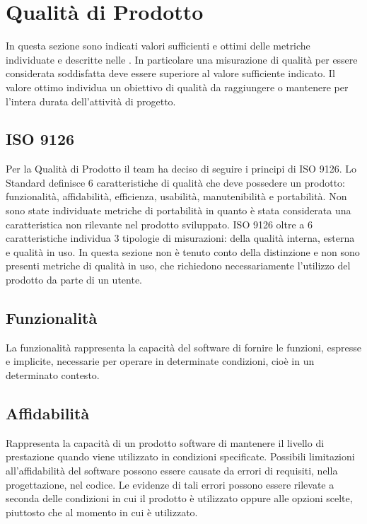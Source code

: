\section{Qualità di Prodotto}
In questa sezione sono indicati valori sufficienti e ottimi delle metriche individuate e descritte nelle \NdP .
In particolare una misurazione di qualità per essere considerata soddisfatta deve essere superiore al valore sufficiente indicato. 
Il valore ottimo individua un obiettivo di qualità da raggiungere o mantenere per l'intera durata dell'attività di progetto.
\subsection{ISO 9126}
Per la Qualità di Prodotto il team ha deciso di seguire i principi di ISO 9126.
Lo Standard definisce 6 caratteristiche di qualità che deve possedere un prodotto: funzionalità, affidabilità, efficienza, usabilità, manutenibilità e portabilità. 
Non sono state individuate metriche di portabilità in quanto è stata considerata una caratteristica non rilevante nel prodotto sviluppato. 
ISO 9126 oltre a 6 caratteristiche individua 3 tipologie di misurazioni: della qualità interna, esterna e qualità in uso. 
In questa sezione non è tenuto conto della distinzione e non sono presenti metriche di qualità in uso, che richiedono necessariamente l'utilizzo del prodotto da parte di un utente.

\subsection{Funzionalità}
La funzionalità rappresenta la capacità del software di fornire le funzioni, espresse e implicite, necessarie per operare in determinate condizioni, cioè in un determinato contesto.
\def\productquality{
    {
        Correttezza dello scambio dei dati,
        $D_{err} = \#\ di\ errori$, 
        -,
        $D_{err} = 0$,
        un valore sufficiente sarà deciso in fasi successive del progetto
    },
}


\subsection{Affidabilità}
Rappresenta la capacità di un prodotto software di mantenere il livello di prestazione quando viene utilizzato in condizioni specificate. Possibili limitazioni all'affidabilità del software possono essere causate da errori di requisiti, nella progettazione, nel codice. Le evidenze di tali errori possono essere rilevate a seconda delle condizioni in cui il prodotto è utilizzato oppure alle opzioni scelte, piuttosto che al momento in cui è utilizzato.
\def\productquality{
    {
        Densità di errori,
        $E_{density} = A_{err}/B_{tests}$, 
        -,
        -,
        è stato ritenuto prematuro definire valori sufficienti e ottimi per la metrica
    },
}


